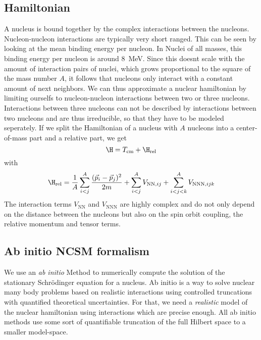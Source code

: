 \subsection{Hamiltonian}
A nucleus is bound together by the complex interactions between the nucleons. Nucleon-nucleon interactions are typically very short ranged. This can be seen by looking at the mean binding energy per nucleon. In Nuclei of all masses, this binding energy per nucleon is around \SI{8}{\mega\electronvolt}. Since this doesnt scale with the amount of interaction pairs of nuclei, which grows proportional to the square of the mass number $A$, it follows that nucleons only interact with a constant amount of next neighbors. We can thus approximate a nuclear hamiltonian by limiting ourselfs to nucleon-nucleon interactions between two or three nucleons. Interactions between three nucleons can not be described by interactions between two nucleons and are thus irreducible, so that they have to be modeled seperately. If we split the Hamiltonian of a nucleus with $A$ nucleons into a center-of-mass part and a relative part, we get
\begin{equation}
  \H = T_{\mathrm{cm}} + \H_{\mathrm{rel}}
\end{equation}
with
\begin{equation}
  \H_{\mathrm{rel}} = \frac{1}{A}\sum_{i<j}^A\frac{(\vec{p}_i - \vec{p}_j)^2}{2m} + \sum_{i<j}^A V_{\mathrm{NN}, ij} + \sum_{i<j<k}^AV_{\mathrm{NNN}, ijk}
\end{equation}
The interaction terms $V_\mathrm{NN}$ and $V_\mathrm{NNN}$ are highly complex and do not only depend on the distance between the nucleons but also on the spin orbit coupling, the relative momentum and tensor terms.
\subsection{Ab initio NCSM formalism}
We use an \textit{ab initio} Method to numerically compute the solution of the stationary Schrödinger equation for a nucleus. Ab initio is a way to solve nuclear many body problems based on realistic interactions using controlled truncations with quantified theoretical uncertainties. For that, we need a \textit{realistic} model of the nuclear hamiltonian using interactions which are precise enough. All ab initio methods use some sort of quantifiable truncation of the full Hilbert space to a smaller model-space.

